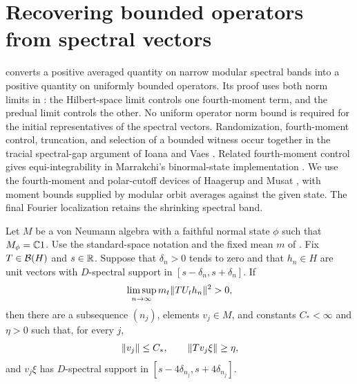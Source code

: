 \section{Recovering bounded operators from spectral vectors}
\label{sec:recovery}

 converts a positive averaged quantity on narrow modular
spectral bands into a positive quantity on uniformly bounded operators.
Its proof uses both norm limits in : the Hilbert-space
limit controls one fourth-moment term, and the predual limit controls the
other.  No uniform operator norm bound is required for the initial
representatives of the spectral vectors.
Randomization, fourth-moment control, truncation, and selection of a
bounded witness occur together in the tracial spectral-gap argument of
Ioana and Vaes \cite[proof of the appendix theorem, pp.~129--130]{IoanaVaes2015}.
Related fourth-moment control gives equi-integrability in Marrakchi's
binormal-state implementation \cite[Section~2, Claim~2.2]{Marrakchi2025}.
We use the fourth-moment and polar-cutoff devices of Haagerup and Musat
\cite[Lemma~2.6 and Remark~2.8]{HaagerupMusat2007}, with moment bounds
supplied by modular orbit averages against the given state. The final
Fourier localization retains the shrinking spectral band.

\begin{theorem}
\label{rec:bounded}
Let $M$ be a von Neumann algebra with a faithful normal state $\phi$ such
that $M_\phi=\mathbb C1$.  Use the standard-space notation and the fixed mean $m$
of .  Fix $T\in\mathcal B(H)$ and $s\in\mathbb R$.  Suppose that
$\delta_n>0$ tends to zero and that $h_n\in H$ are unit vectors with
$D$-spectral support in $[s-\delta_n,s+\delta_n]$.  If
\begin{equation}
\label{eq:recovery-positive}
 \limsup_{n\to\infty}m_t\lVert TU_th_n\rVert^{2}>0,
\end{equation}
then there are a subsequence $(n_j)$, elements $v_j\in M$, and constants
$C_*<\infty$ and $\eta>0$ such that, for every $j$,
\[
 \lVert v_j\rVert\le C_*,\qquad
 \lVert Tv_j\xi\rVert\ge\eta,
\]
and $v_j\xi$ has $D$-spectral support in
$[s-4\delta_{n_j},s+4\delta_{n_j}]$.
\end{theorem}

